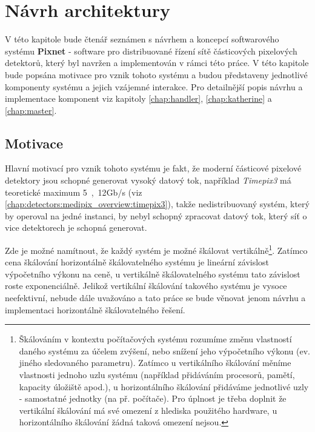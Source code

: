 

\chapter{Návrh architektury}\label{chap:arch}
V této kapitole bude čtenář seznámen s návrhem a koncepcí softwarového systému \textbf{Pixnet} - software pro distribuované řízení sítě částicových pixelových detektorů, který byl navržen a implementován v rámci této práce. V této kapitole bude popsána motivace pro vznik tohoto systému a budou představeny jednotlivé komponenty systému a jejich vzájemné interakce. Pro detailnější popis návrhu a implementace komponent viz kapitoly \ref{chap:handler}, \ref{chap:katherine} a \ref{chap:master}.

\section{Motivace}\label{chap:arch:motivation}
Hlavní motivací pro vznik tohoto systému je fakt, že moderní částicové pixelové detektory jsou schopné generovat vysoký datový tok, například \textit{Timepix3} má teoretické maximum \unit{5,12}{Gb/s} (viz \ref{chap:detectors:medipix_overview:timepix3}), takže nedistribuovaný systém, který by operoval na jedné instanci, by nebyl schopný zpracovat datový tok, který síť o vice detektorech je schopná generovat. 

Zde je možné namítnout, že každý systém je možné škálovat vertikálně\footnote{Škálováním v kontextu počítačových systému rozumíme změnu vlastností daného systému za účelem zvýšení, nebo snížení jeho výpočetního výkonu (ev. jiného sledovaného parametru). Zatímco u vertikálního škálování měníme vlastnosti jednoho uzlu systému (například přidáváním procesorů, pamětí, kapacity úložiště apod.), u horizontálního škálování přidáváme jednotlivé uzly - samostatné  jednotky (na př. počítače). Pro úplnost je třeba doplnit že vertikální škálování má své omezení z hlediska použitého hardware, u horizontálního škálování žádná taková omezení nejsou.}. Zatímco cena škálování horizontálně škálovatelného systému je lineární závislost výpočetního výkonu na ceně, u vertikálně škálovatelného systému tato závislost roste exponenciálně. Jelikož vertikální škálování takového systému je  vysoce neefektivní, nebude dále uvažováno a tato práce se bude věnovat jenom návrhu a implementaci horizontálně škálovatelného řešení.

